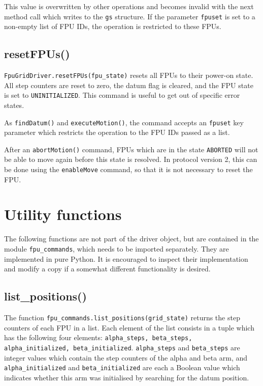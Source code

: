 \documentclass[fontsize=12,a4paper]{scrreprt}
\begin{document}
This value is overwritten by other operations and becomes invalid with
the next method call which writes to the \texttt{gs} structure.  If
the parameter \texttt{fpuset} is set to a non-empty list of FPU IDs,
the operation is restricted to these FPUs.

\section{resetFPUs()}

\texttt{FpuGridDriver.resetFPUs(fpu\_state)} resets all FPUs to their
power-on state. All step counters are reset to zero, the datum flag is
cleared, and the FPU state is set to \texttt{UNINITIALIZED}. This
command is useful to get out of specific error states.

As \texttt{findDatum()} and \texttt{executeMotion()}, the command
accepts an \texttt{fpuset} key parameter which restricts the operation
to the FPU IDs passed as a list.

After an \texttt{abortMotion()} command, FPUs which are in the state
\texttt{ABORTED} will not be able to move again before this state is
resolved. In protocol version 2, this can be done using the
\texttt{enableMove} command, so that it is not necessary to reset the
FPU.


\chapter{Utility functions}

\minitoc

The following functions are not part of the driver object, but are
contained in the module \texttt{fpu\_commands}, which needs to be
imported separately. They are implemented in pure Python. It is
encouraged to inspect their implementation and modify a copy if a
somewhat different functionality is desired.

\section{list\_positions()}
\label{sec:listpositions}
 
The function \texttt{fpu\_commands.list\_positions(grid\_state)}
returns the step counters of each FPU in a list.  Each element of the
list consists in a tuple which has the following four elements:
\texttt{alpha\_steps, beta\_steps, alpha\_initialized,
  beta\_initialized}. \texttt{alpha\_steps} and \texttt{beta\_steps}
are integer values which contain the step counters of the alpha and
beta arm, and \texttt{alpha\_initialized} and
\texttt{beta\_initialized} are each a Boolean value which indicates
whether this arm was initialised by searching for the datum position.
\end{document}
